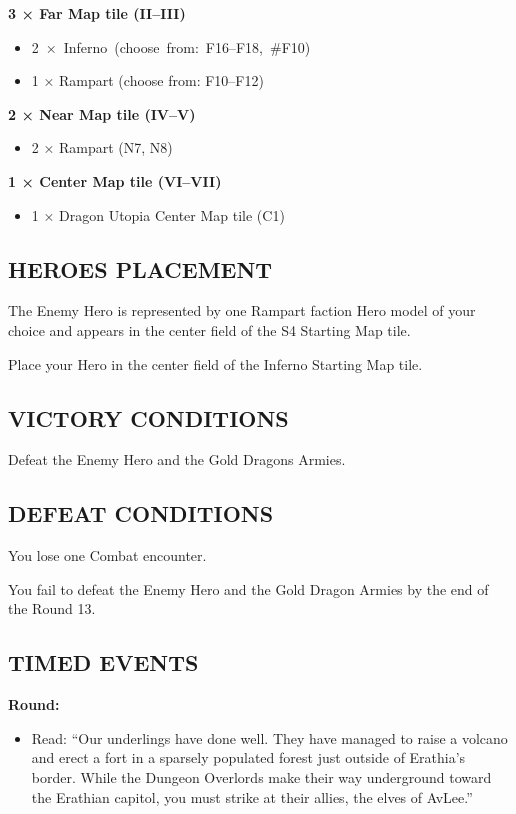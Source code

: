 \begin{multicols*}{2}
\vspace*{\fill}\columnbreak

\textbf{3 × Far Map tile (II--III)}
\begin{itemize}
  \item \mbox{2 × Inferno (choose from: F16--F18, \#F10)}
  \item 1 × Rampart (choose from: F10--F12)
\end{itemize}

\textbf{2 × Near Map tile (IV--V)}
\begin{itemize}
  \item 2 × Rampart (N7, N8)
\end{itemize}

\textbf{1 × Center Map tile (VI--VII)}
\begin{itemize}
  \item 1 × Dragon Utopia Center Map tile (C1)
\end{itemize}

\subsection*{\MakeUppercase{Heroes placement}}

The Enemy Hero is represented by one Rampart faction Hero model of your choice
and appears in the center field of the S4 Starting Map tile.

Place your Hero in the center field of the Inferno Starting Map tile.

\subsection*{\MakeUppercase{Victory Conditions}}

Defeat the Enemy Hero and the Gold Dragons Armies.

\subsection*{\MakeUppercase{Defeat Conditions}}

You lose one Combat encounter.

You fail to defeat the Enemy Hero and the Gold Dragon Armies by the end of the Round 13.

\subsection*{\MakeUppercase{Timed Events}}

\textbf{ Round:}
\begin{itemize}
  \item Read: ``Our underlings have done well. They have managed to raise a volcano
    and erect a fort in a sparsely populated forest just outside of Erathia's border.
    While the Dungeon Overlords make their way underground toward the Erathian capitol,
    you must strike at their allies, the elves of AvLee.''
\end{itemize}


\end{multicols*}
